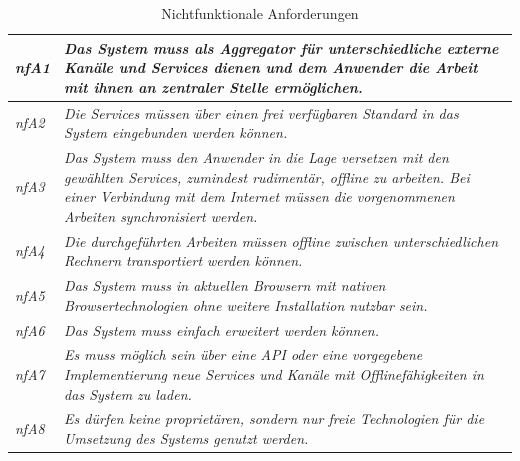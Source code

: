 \renewcommand{\arraystretch}{1.4} 
\begin{table}[h]
\caption{Nichtfunktionale Anforderungen}
\begin{tabularx}{\textwidth}{ l | X }
\emph{nfA1} & \emph{Das System muss als Aggregator für unterschiedliche externe Kanäle und Services dienen und dem Anwender die Arbeit mit ihnen an zentraler Stelle ermöglichen.} \\ \hline
\emph{nfA2} & \emph{Die Services müssen über einen frei verfügbaren Standard in das System eingebunden werden können.} \\ \hline
\emph{nfA3} & \emph{Das System muss den Anwender in die Lage versetzen mit den gewählten Services, zumindest rudimentär, offline zu arbeiten. Bei einer Verbindung mit dem Internet müssen die vorgenommenen Arbeiten synchronisiert werden.} \\ \hline
\emph{nfA4} & \emph{Die durchgeführten Arbeiten müssen offline zwischen unterschiedlichen Rechnern transportiert werden können.} \\ \hline
\emph{nfA5} & \emph{Das System muss in aktuellen Browsern mit nativen Browsertechnologien ohne weitere Installation nutzbar sein.} \\ \hline
\emph{nfA6} & \emph{Das System muss einfach erweitert werden können.} \\ \hline
\emph{nfA7} & \emph{Es muss möglich sein über eine API oder eine vorgegebene Implementierung neue Services und Kanäle mit Offlinefähigkeiten in das System zu laden.} \\ \hline
\emph{nfA8} & \emph{Es dürfen keine proprietären, sondern nur freie Technologien für die Umsetzung des Systems genutzt werden.} \\ \hline
\end{tabularx}
\label{table:nichtfunktionale_anforderungen}
\end{table}
